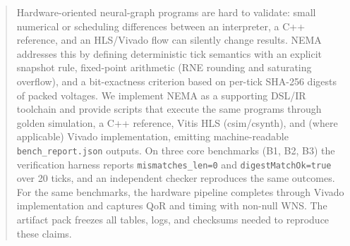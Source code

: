 \begin{abstract}
Hardware-oriented neural-graph programs are hard to validate: small numerical or scheduling differences between an interpreter, a C++ reference, and an HLS/Vivado flow can silently change results. NEMA addresses this by defining deterministic tick semantics with an explicit snapshot rule, fixed-point arithmetic (RNE rounding and saturating overflow), and a bit-exactness criterion based on per-tick SHA-256 digests of packed voltages. We implement NEMA as a supporting DSL/IR toolchain and provide scripts that execute the same programs through golden simulation, a C++ reference, Vitis HLS (csim/csynth), and (where applicable) Vivado implementation, emitting machine-readable \texttt{bench\_report.json} outputs. On three core benchmarks (B1, B2, B3) the verification harness reports \texttt{mismatches\_len=0} and \texttt{digestMatchOk=true} over 20 ticks, and an independent checker reproduces the same outcomes. For the same benchmarks, the hardware pipeline completes through Vivado implementation and captures QoR and timing with non-null WNS. The artifact pack freezes all tables, logs, and checksums needed to reproduce these claims.
\end{abstract}
